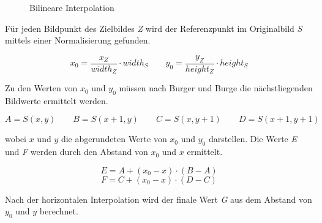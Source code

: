 \begin{figure}[htbp]
  \vspace{0.5cm}
  \centering
   \caption{Bilineare Interpolation \cite[S.388]{burger:bv}}
  \label{bilinear_interpolation}
  \vspace{0.5cm}
\end{figure}

Für jeden Bildpunkt des Zielbildes \textit{Z} wird der Referenzpunkt im Originalbild \textit{S} mittels einer Normalisierung gefunden.

\begin{equation}
 x_{0} = \frac{x_{Z}}{width_{Z}}\cdot width_{S}\qquad
 y_{0} = \frac{y_{Z}}{height_{Z}}\cdot height_{S}
\end{equation}

Zu den Werten von $x_{0}$ und $y_{0}$ müssen nach Burger und Burge\cite[S. 387 ff]{burger:bv} die nächstliegenden Bildwerte ermittelt werden.

\begin{equation}
A= S(x,y) \qquad B=S(x+1,y) \qquad C=S(x,y+1)\qquad D=S(x+1,y+1)
\end{equation}

wobei $x$ und $y$ die abgerundeten Werte von $x_{0}$ und $y_{0}$ darstellen. Die Werte \textit{E} und \textit{F} werden durch den Abstand von $x_{0}$ und $x$ ermittelt.

\begin{equation}
E = A + (x_0 - x) \cdot (B - A)
\end{equation}
\begin{equation}
F = C + (x_0 - x) \cdot (D-C)
\end{equation}

Nach der horizontalen Interpolation wird der finale Wert \textit{G} aus dem Abstand von $y_0$ und $y$ berechnet.

